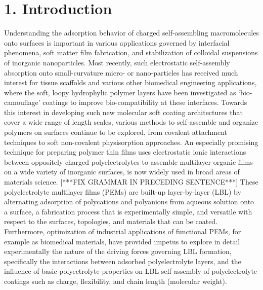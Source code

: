 \documentclass[journal=mamobx,manuscript=article]{achemso}
\begin{document}
\section{1. Introduction}  %
    \label{sec-intro}
Understanding the adsorption behavior of charged self-assembling macromolecules onto surfaces is important in various applications governed by interfacial phenomena, soft matter film fabrication, and stabilization of colloidal suspensions of inorganic nanoparticles.\cite{Dorris2011}  Most recently, such electrostatic self-assembly absorption onto small-curvature micro- or nano-particles has received much interest for tissue scaffolds and various other biomedical engineering applications, where the soft, loopy hydrophylic polymer layers have been investigated as `bio-camouflage' coatings to improve bio-compatibility at these interfaces.\cite{Landry2019} 
Towards this interest in developing such new molecular soft coating architectures that cover a wide range of length scales, various methods to self-assemble and organize polymers on surfaces continue to be explored, from covalent attachment techniques\cite{doi:10.1002/ijch.199600050,B210143M,doi:10.1002/masy.200450305} to soft non-covalent physisorption approaches.\cite{Chen1992,Serizawa2002}  
An especially promising technique for preparing polymer thin films uses electrostatic ionic interactions between oppositely charged polyelectrolytes to assemble multilayer organic films on a wide variety of inorganic surfaces, is now widely used in broad areas of materials science.\cite{Decher1997}  [***FIX GRAMMAR IN PRECEDING SENTENCE***]
These polyelectrolyte multilayer films (PEMs) are built-up layer-by-layer (LBL) by alternating adsorption of polycations and polyanions from aqueous solution onto a surface,\cite{Decher2006}  
a fabrication process that is experimentally simple, and versatile with respect to the surfaces, topologies, and materials that can be coated.  
Furthermore, optimization of industrial applications of functional PEMs, for example as biomedical materials, have provided impetus to explore in detail experimentally the nature of the driving forces governing LBL formation, specifically the interactions between adsorbed polyelectrolyte layers, and the influence of basic polyectrolyte properties on LBL self-assembly of polyelectrolyte coatings such as charge, flexibility, and chain length (molecular weight).
\end{document}
